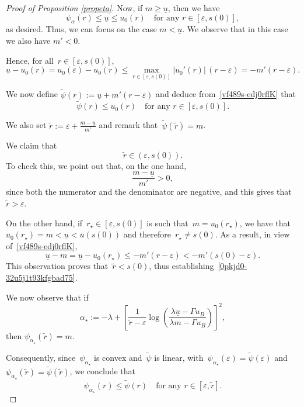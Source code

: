 \documentclass[12pt,a4paper,intlimits,sumlimits]{amsart}
\theoremstyle{definition}
\theoremstyle{plain}
\numberwithin{equation}{section}
\renewcommand{\leq}{\leqslant}
\renewcommand{\le}{\leqslant}
\renewcommand{\geq}{\geqslant}
\begin{document}
\begin{proof}[Proof of Proposition \ref{propeta}]
Now, if $m\geq \underline u$, then we have
\[
\psi_\alpha(r)\leq \underline u \leq u_0(r) \quad \mbox{for any }r\in [\varepsilon, s(0)],
\]
as desired. Thus, we can focus on the case $m<\underline u$.
We observe that in this case we also have $m'<0$. 

Hence, for all~$r\in[\varepsilon,s(0)]$,
\begin{equation}\label{vf489s-edj0rflK} \underline u-u_0(r)=u_0(\varepsilon)-u_0(r)\le \max_{r\in[\varepsilon,s(0)]} |u_0'(r)|\,(r-\varepsilon)=-m'(r-\varepsilon).\end{equation}

We now define $\widetilde \psi(r):=\underline u+m'(r-\varepsilon)$ and deduce from~\eqref{vf489s-edj0rflK} that
\begin{equation}\label{xcghjcvghuvb1}
\widetilde \psi(r)\leq u_0(r)\quad \mbox{for any }r\in [\varepsilon, s(0)].
\end{equation}

We also set $\widetilde r:= \varepsilon+\frac{m-\underline u}{m'}$ and remark that~$\widetilde \psi(\widetilde r)=m$. 

We claim that
\begin{equation}\label{0pkjd0-32u5j1t93kfgbad75}
\widetilde r\in(\varepsilon,s(0)).\end{equation}
To check this, we point out that, on the one hand, \begin{equation*}
\frac{m-\underline u}{m'}>0,
\end{equation*}since both the numerator and the denominator are negative, and this gives that~$\widetilde r>\varepsilon$.

On the other hand, if~$r_\star\in[\varepsilon,s(0)]$ is such that~$m=u_0(r_\star)$, we have that~$u_0(r_\star)=m<\underline u<\overline u(s(0))$ and therefore~$r_\star\ne s(0)$. As a result, in view of~\eqref{vf489s-edj0rflK},
$$ \underline u-m=\underline u-u_0(r_\star)\le -m'(r-\varepsilon)<-m'(s(0)-\varepsilon).$$
This observation proves that~$\widetilde r<s(0)$, thus establishing~\eqref{0pkjd0-32u5j1t93kfgbad75}.

We now observe that if 
\[
\alpha_\star:=-\lambda+\left[\frac{1}{\widetilde r-\varepsilon}\log\left(\frac{\lambda \underline u-\Gamma u_B}{\lambda m-\Gamma u_B}\right)\right]^2,
\]
then $\psi_{\alpha_\star}(\widetilde r)=m$. 

Consequently, since~$\psi_{\alpha_\star}$ is convex and~$\widetilde\psi$ is linear, with~$\psi_{\alpha_\star}(\varepsilon)=\widetilde\psi(\varepsilon)$ and~$\psi_{\alpha_\star}(\widetilde r)=\widetilde\psi(\widetilde r)$, we conclude that
\begin{equation}\label{xcghjcvghuvb2}
\psi_{\alpha_\star}(r)\leq \widetilde \psi (r) \quad \mbox{for any }r\in [\varepsilon, \widetilde r].
\end{equation}


\end{proof}
\end{document}
